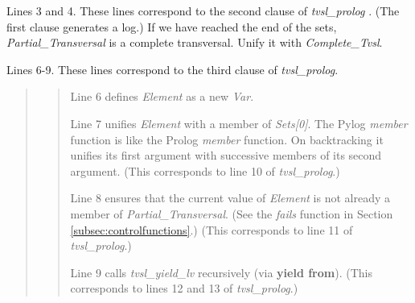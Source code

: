 Lines 3 and 4. These lines correspond to the second clause of \textit{tvsl\_prolog} . (The first clause generates a log.) If we have reached the end of the sets, \textit{Partial\_Transversal} is a complete transversal. Unify it with \textit{Complete\_Tvsl}.

Lines 6-9. These lines correspond to the third clause of \textit{tvsl\_prolog}.

\begin{quote}
\begin{quote}
Line 6 defines \textit{Element} as a new \textit{Var}.

\smallv
Line 7 unifies \textit{Element} with a member of \textit{Sets[0]}. The Pylog \textit{member} function is like the Prolog  \textit{member} function. On backtracking it unifies its first argument with successive members of its second argument. (This corresponds to line 10 of \textit{tvsl\_prolog}.)

\smallv
Line 8 ensures that the current value of  \textit{Element} is not already a member of \textit{Partial\_Transversal}. (See the \textit{fails} function in Section \ref{subsec:controlfunctions}.)  (This corresponds to line 11 of  \textit{tvsl\_prolog}.)

\smallv
Line 9 calls \textit{tvsl\_yield\_lv} recursively (via \textbf{yield from}). (This corresponds to lines 12 and 13 of \textit{tvsl\_prolog}.)
\end{quote}
\end{quote}

